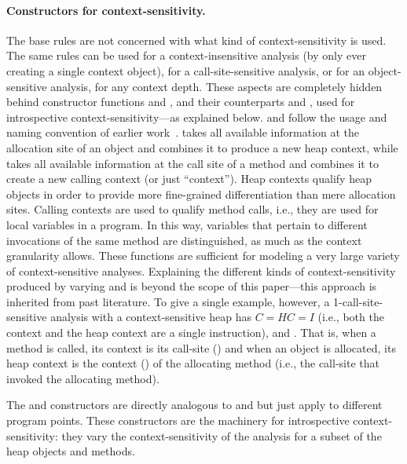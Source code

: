 \paragraph{Constructors for context-sensitivity.}
  The base rules are not concerned with what kind of
  context-sensitivity is used. The same rules can be used for a
  context-insensitive analysis (by only ever creating a single context
  object), for a call-site-sensitive analysis, or for an
  object-sensitive analysis, for any context depth. These aspects are
  completely hidden behind constructor functions  and
  , and their counterparts 
  and , used for introspective
  context-sensitivity---as explained below.   and
   follow the usage and naming convention of earlier
  work~\cite{popl:2011:Smaragdakis,pldi:2013:Kastrinis}.  takes
  all available information at the allocation site of an object and
  combines it to produce a new heap context, while 
  takes all available information at the call site of a method and
  combines it to create a new calling context (or just ``context'').
  Heap contexts qualify heap objects in order to provide more
  fine-grained differentiation than mere allocation sites.  Calling
  contexts are used to qualify method calls, i.e., they are used for
  local variables in a program. In this way, variables that pertain to
  different invocations of the same method are distinguished, as much
  as the context granularity allows.  These functions are sufficient
  for modeling a very large variety of context-sensitive
  analyses. Explaining the different kinds of context-sensitivity
  produced by varying  and  is beyond
  the scope of this paper---this approach is inherited from past
  literature\cite{popl:2011:Smaragdakis,pldi:2013:Kastrinis}.  To give a single
  example, however, a 1-call-site-sensitive analysis with a
  context-sensitive heap has $C = HC = I$ (i.e., both the context and
  the heap context are a single instruction),  and . That is, when a method is called, its context is
  its call-site () and when an object is allocated, its
  heap context is the context () of the allocating method
  (i.e., the call-site that invoked the allocating method).

  The  and 
  constructors are directly analogous to  and
   but just apply to different program points. These
  constructors are the machinery for introspective
  context-sensitivity: they vary the context-sensitivity of the
  analysis for a subset of the heap objects and methods.


